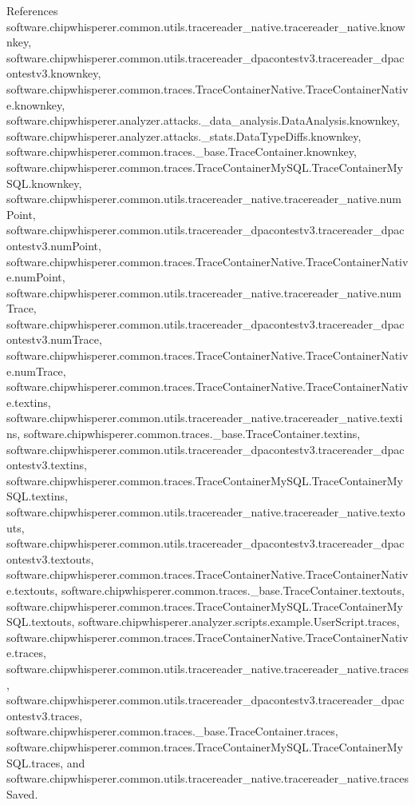 References software.\+chipwhisperer.\+common.\+utils.\+tracereader\+\_\+native.\+tracereader\+\_\+native.\+knownkey, software.\+chipwhisperer.\+common.\+utils.\+tracereader\+\_\+dpacontestv3.\+tracereader\+\_\+dpacontestv3.\+knownkey, software.\+chipwhisperer.\+common.\+traces.\+Trace\+Container\+Native.\+Trace\+Container\+Native.\+knownkey, software.\+chipwhisperer.\+analyzer.\+attacks.\+\_\+data\+\_\+analysis.\+Data\+Analysis.\+knownkey, software.\+chipwhisperer.\+analyzer.\+attacks.\+\_\+stats.\+Data\+Type\+Diffs.\+knownkey, software.\+chipwhisperer.\+common.\+traces.\+\_\+base.\+Trace\+Container.\+knownkey, software.\+chipwhisperer.\+common.\+traces.\+Trace\+Container\+My\+S\+Q\+L.\+Trace\+Container\+My\+S\+Q\+L.\+knownkey, software.\+chipwhisperer.\+common.\+utils.\+tracereader\+\_\+native.\+tracereader\+\_\+native.\+num\+Point, software.\+chipwhisperer.\+common.\+utils.\+tracereader\+\_\+dpacontestv3.\+tracereader\+\_\+dpacontestv3.\+num\+Point, software.\+chipwhisperer.\+common.\+traces.\+Trace\+Container\+Native.\+Trace\+Container\+Native.\+num\+Point, software.\+chipwhisperer.\+common.\+utils.\+tracereader\+\_\+native.\+tracereader\+\_\+native.\+num\+Trace, software.\+chipwhisperer.\+common.\+utils.\+tracereader\+\_\+dpacontestv3.\+tracereader\+\_\+dpacontestv3.\+num\+Trace, software.\+chipwhisperer.\+common.\+traces.\+Trace\+Container\+Native.\+Trace\+Container\+Native.\+num\+Trace, software.\+chipwhisperer.\+common.\+traces.\+Trace\+Container\+Native.\+Trace\+Container\+Native.\+textins, software.\+chipwhisperer.\+common.\+utils.\+tracereader\+\_\+native.\+tracereader\+\_\+native.\+textins, software.\+chipwhisperer.\+common.\+traces.\+\_\+base.\+Trace\+Container.\+textins, software.\+chipwhisperer.\+common.\+utils.\+tracereader\+\_\+dpacontestv3.\+tracereader\+\_\+dpacontestv3.\+textins, software.\+chipwhisperer.\+common.\+traces.\+Trace\+Container\+My\+S\+Q\+L.\+Trace\+Container\+My\+S\+Q\+L.\+textins, software.\+chipwhisperer.\+common.\+utils.\+tracereader\+\_\+native.\+tracereader\+\_\+native.\+textouts, software.\+chipwhisperer.\+common.\+utils.\+tracereader\+\_\+dpacontestv3.\+tracereader\+\_\+dpacontestv3.\+textouts, software.\+chipwhisperer.\+common.\+traces.\+Trace\+Container\+Native.\+Trace\+Container\+Native.\+textouts, software.\+chipwhisperer.\+common.\+traces.\+\_\+base.\+Trace\+Container.\+textouts, software.\+chipwhisperer.\+common.\+traces.\+Trace\+Container\+My\+S\+Q\+L.\+Trace\+Container\+My\+S\+Q\+L.\+textouts, software.\+chipwhisperer.\+analyzer.\+scripts.\+example.\+User\+Script.\+traces, software.\+chipwhisperer.\+common.\+traces.\+Trace\+Container\+Native.\+Trace\+Container\+Native.\+traces, software.\+chipwhisperer.\+common.\+utils.\+tracereader\+\_\+native.\+tracereader\+\_\+native.\+traces, software.\+chipwhisperer.\+common.\+utils.\+tracereader\+\_\+dpacontestv3.\+tracereader\+\_\+dpacontestv3.\+traces, software.\+chipwhisperer.\+common.\+traces.\+\_\+base.\+Trace\+Container.\+traces, software.\+chipwhisperer.\+common.\+traces.\+Trace\+Container\+My\+S\+Q\+L.\+Trace\+Container\+My\+S\+Q\+L.\+traces, and software.\+chipwhisperer.\+common.\+utils.\+tracereader\+\_\+native.\+tracereader\+\_\+native.\+traces\+Saved.


